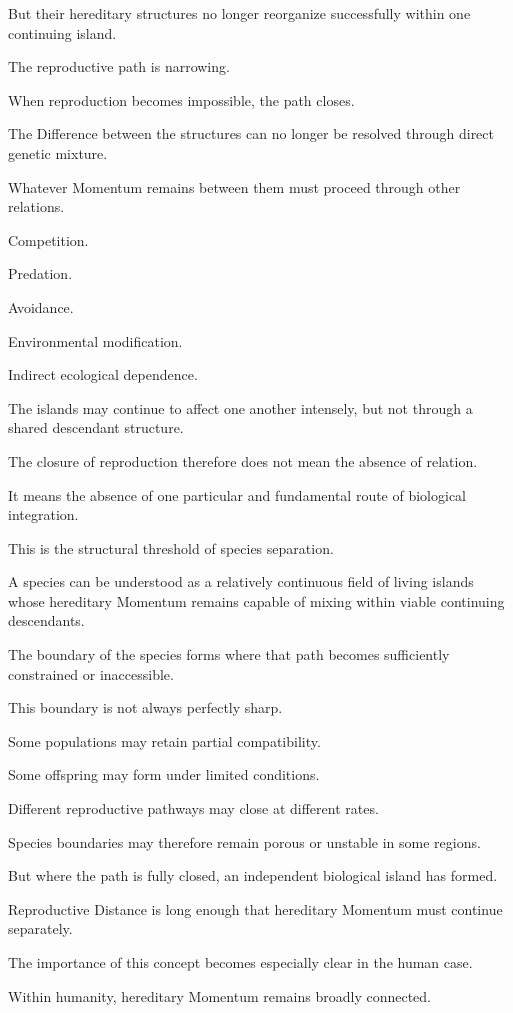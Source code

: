 But their hereditary structures no longer reorganize successfully within one continuing island.

The reproductive path is narrowing.

When reproduction becomes impossible, the path closes.

The Difference between the structures can no longer be resolved through direct genetic mixture.

Whatever Momentum remains between them must proceed through other relations.

Competition.

Predation.

Avoidance.

Environmental modification.

Indirect ecological dependence.

The islands may continue to affect one another intensely, but not through a shared descendant structure.

The closure of reproduction therefore does not mean the absence of relation.

It means the absence of one particular and fundamental route of biological integration.

This is the structural threshold of species separation.

A species can be understood as a relatively continuous field of living islands whose hereditary Momentum remains capable of mixing within viable continuing descendants.

The boundary of the species forms where that path becomes sufficiently constrained or inaccessible.

This boundary is not always perfectly sharp.

Some populations may retain partial compatibility.

Some offspring may form under limited conditions.

Different reproductive pathways may close at different rates.

Species boundaries may therefore remain porous or unstable in some regions.

But where the path is fully closed, an independent biological island has formed.

Reproductive Distance is long enough that hereditary Momentum must continue separately.

The importance of this concept becomes especially clear in the human case.

Within humanity, hereditary Momentum remains broadly connected.

